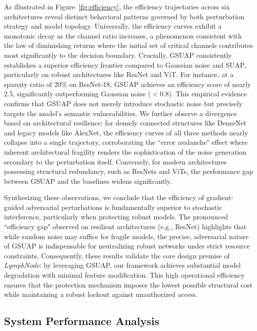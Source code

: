 \documentclass[conference]{IEEEtran}
\begin{document}
As illustrated in Figure~\ref{fig:efficiency}, the efficiency trajectories across six architectures reveal distinct behavioral patterns governed by both perturbation strategy and model topology. Universally, the efficiency curves exhibit a monotonic decay as the channel ratio increases, a phenomenon consistent with the law of diminishing returns where the initial set of critical channels contributes most significantly to the decision boundary. Crucially, GSUAP consistently establishes a superior efficiency frontier compared to Gaussian noise and SUAP, particularly on robust architectures like ResNet and ViT. For instance, at a sparsity ratio of 20\% on ResNet-18, GSUAP achieves an efficiency score of nearly 2.5, significantly outperforming Gaussian noise ($<0.8$). This empirical evidence confirms that GSUAP does not merely introduce stochastic noise but precisely targets the model's semantic vulnerabilities. We further observe a divergence based on architectural resilience: for densely connected structures like DenseNet and legacy models like AlexNet, the efficiency curves of all three methods nearly collapse into a single trajectory, corroborating the ``error avalanche" effect where inherent architectural fragility renders the sophistication of the noise generation secondary to the perturbation itself. Conversely, for modern architectures possessing structural redundancy, such as ResNets and ViTs, the performance gap between GSUAP and the baselines widens significantly.

Synthesizing these observations, we conclude that the efficiency of gradient-guided adversarial perturbations is fundamentally superior to stochastic interference, particularly when protecting robust models. The pronounced ``efficiency gap" observed on resilient architectures (e.g., ResNet) highlights that while random noise may suffice for fragile models, the precise, adversarial nature of GSUAP is indispensable for neutralizing robust networks under strict resource constraints. Consequently, these results validate the core design premise of \textit{LymphNode}: by leveraging GSUAP, our framework achieves substantial model degradation with minimal feature modification. This high operational efficiency ensures that the protection mechanism imposes the lowest possible structural cost while maintaining a robust lockout against unauthorized access.

\subsection{System Performance Analysis}
\label{sec:overhead}
\end{document}
